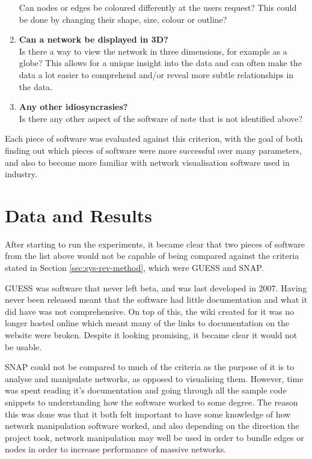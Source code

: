 \documentclass[../dissertation.tex]{subfiles}
\begin{document}
\begin{enumerate}
	Can nodes or edges be coloured differently at the users request? This could be done by changing their shape, size, colour or outline?
	\item \textbf{Can a network be displayed in 3D?}\\
	Is there a way to view the network in three dimensions, for example as a globe? This allows for a unique insight into the data and can often make the data a lot easier to comprehend and/or reveal more subtle relationships in the data.
	\item \textbf{Any other idiosyncrasies?}\\
	Is there any other aspect of the software of note that is not identified above?
\end{enumerate}

Each piece of software was evaluated against this criterion, with the goal of both finding out which pieces of software were more successful over many parameters, and also to become more familiar with network visualisation software used in industry.

\section{Data and Results}

After starting to run the experiments, it became clear that two pieces of software from the list above would not be capable of being compared against the criteria stated in Section \ref{sec:sys-rev-method}, which were GUESS and SNAP.

GUESS was software that never left beta, and was last developed in 2007. Having never been released meant that the software had little documentation and what it did have was not comprehensive. On top of this, the wiki created for it was no longer hosted online which meant many of the links to documentation on the website were broken. Despite it looking promising, it became clear it would not be usable.

SNAP could not be compared to much of the criteria as the purpose of it is to analyse and manipulate networks, as opposed to visualising them. However, time was spent reading it’s documentation and going through all the sample code snippets to understanding how the software worked to some degree. The reason this was done was that it both felt important to have some knowledge of how network manipulation software worked, and also depending on the direction the project took, network manipulation may well be used in order to bundle edges or nodes in order to increase performance of massive networks.
\end{document}
